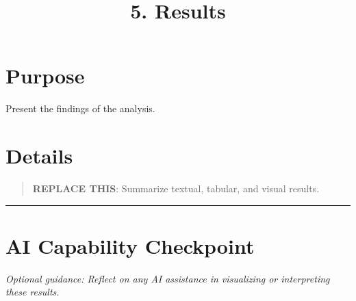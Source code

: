 \documentclass[
]{report}
\title{5. Results}
\author{}
\date{}
\renewcommand*\contentsname{Table of contents}
\newcommand\contentsname{Table of contents}
\begin{document}
\maketitle

\renewcommand*\contentsname{Table of contents}
{
\hypersetup{linkcolor=}
\setcounter{tocdepth}{2}
\tableofcontents
}

\chapter{Purpose}\label{purpose}

Present the findings of the analysis.

\chapter{Details}\label{details}

\begin{quote}
\textbf{REPLACE THIS}: Summarize textual, tabular, and visual results.
\end{quote}

\begin{center}\rule{0.5\linewidth}{0.5pt}\end{center}

\chapter{AI Capability Checkpoint}\label{ai-capability-checkpoint}

\emph{Optional guidance: Reflect on any AI assistance in visualizing or
interpreting these results.}
\end{document}

